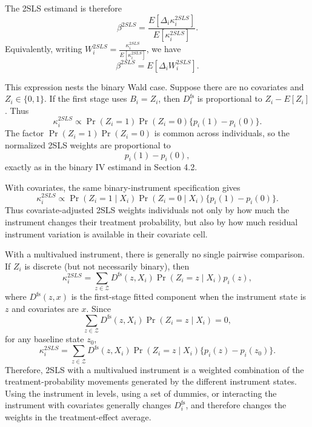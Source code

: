 \documentclass[11pt]{article}
\newcommand{\1}{\mathbf{1}}
\begin{document}
The 2SLS estimand is therefore
\[
\beta^{2SLS}
=
\frac{E[\Delta_i\kappa_i^{2SLS}]}
     {E[\kappa_i^{2SLS}]}.
\]
Equivalently, writing
$
W_i^{2SLS}
=
\frac{\kappa_i^{2SLS}}{E[\kappa_i^{2SLS}]}
$,
we have
\[
\beta^{2SLS}=E[\Delta_i W_i^{2SLS}].
\]

This expression nests the binary Wald case. Suppose there are no covariates and
\(Z_i\in\{0,1\}\). If the first stage uses \(B_i=Z_i\), then
\(D_i^{\mathrm{fs}}\) is proportional to \(Z_i-E[Z_i]\). Thus
\[
\kappa_i^{2SLS}
\propto
\Pr(Z_i=1)\Pr(Z_i=0)\{p_i(1)-p_i(0)\}.
\]
The factor \(\Pr(Z_i=1)\Pr(Z_i=0)\) is common across individuals, so the normalized
2SLS weights are proportional to
\[
p_i(1)-p_i(0),
\]
exactly as in the binary IV estimand in Section 4.2.

With covariates, the same binary-instrument specification gives
\[
\kappa_i^{2SLS}
\propto
\Pr(Z_i=1\mid X_i)\Pr(Z_i=0\mid X_i)\{p_i(1)-p_i(0)\}.
\]
Thus covariate-adjusted 2SLS weights individuals not only by how much the instrument
changes their treatment probability, but also by how much residual instrument variation
is available in their covariate cell.

With a multivalued instrument, there is generally no single pairwise comparison. If
\(Z_i\) is discrete (but not necessarily binary), then
\[
\kappa_i^{2SLS}
=
\sum_{z\in\mathcal Z}
D^{\mathrm{fs}}(z,X_i)\Pr(Z_i=z\mid X_i)p_i(z),
\]
where \(D^{\mathrm{fs}}(z,x)\) is the first-stage fitted component when the instrument
state is \(z\) and covariates are \(x\). Since
\[
\sum_{z\in\mathcal Z}
D^{\mathrm{fs}}(z,X_i)\Pr(Z_i=z\mid X_i)=0,
\]
for any baseline state \(z_0\),
\[
\kappa_i^{2SLS}
=
\sum_{z\in\mathcal Z}
D^{\mathrm{fs}}(z,X_i)\Pr(Z_i=z\mid X_i)
\{p_i(z)-p_i(z_0)\}.
\]
Therefore, 2SLS with a multivalued instrument is a weighted combination of the
treatment-probability movements generated by the different instrument states. Using the
instrument in levels, using a set of dummies, or interacting the instrument with
covariates generally changes \(D_i^{\mathrm{fs}}\), and therefore changes the weights in
the treatment-effect average.
\end{document}
